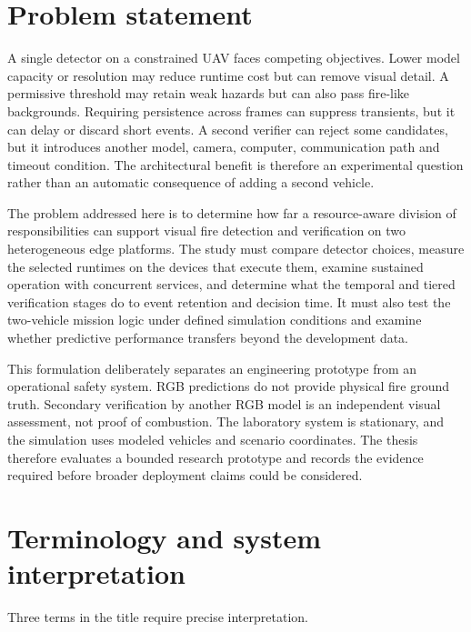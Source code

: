 \section{Problem statement}
\label{sec:introduction:problem}

A single detector on a constrained UAV faces competing objectives. Lower model
capacity or resolution may reduce runtime cost but can remove visual detail.
A permissive threshold may retain weak hazards but can also pass fire-like
backgrounds. Requiring persistence across frames can suppress transients, but
it can delay or discard short events. A second verifier can reject some
candidates, but it introduces another model, camera, computer, communication
path and timeout condition. The architectural benefit is therefore an
experimental question rather than an automatic consequence of adding a second
vehicle.

The problem addressed here is to determine how far a resource-aware division
of responsibilities can support visual fire detection and verification on two
heterogeneous edge platforms. The study must compare detector choices, measure
the selected runtimes on the devices that execute them, examine sustained
operation with concurrent services, and determine what the temporal and tiered
verification stages do to event retention and decision time. It must also test
the two-vehicle mission logic under defined simulation conditions and examine
whether predictive performance transfers beyond the development data.

This formulation deliberately separates an engineering prototype from an
operational safety system. RGB predictions do not provide physical fire ground
truth. Secondary verification by another RGB model is an independent visual
assessment, not proof of combustion. The laboratory system is stationary, and
the simulation uses modeled vehicles and scenario coordinates. The thesis
therefore evaluates a bounded research prototype and records the evidence
required before broader deployment claims could be considered.

\section{Terminology and system interpretation}
\label{sec:introduction:terms}

Three terms in the title require precise interpretation.

